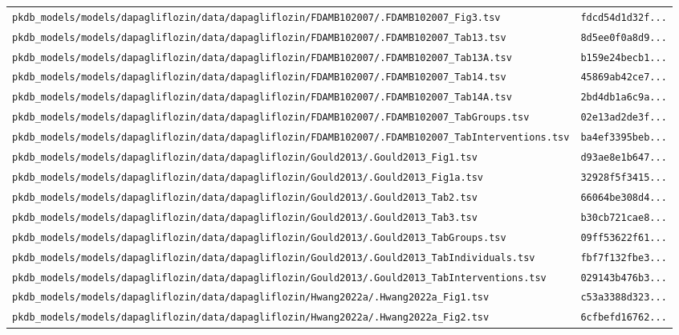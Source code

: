 \begin{longtable}{ll}
\texttt{pkdb\_models/models/dapagliflozin/data/dapagliflozin/FDAMB102007/.FDAMB102007\_Fig3.tsv} & \texttt{fdcd54d1d32f...} \\
\texttt{pkdb\_models/models/dapagliflozin/data/dapagliflozin/FDAMB102007/.FDAMB102007\_Tab13.tsv} & \texttt{8d5ee0f0a8d9...} \\
\texttt{pkdb\_models/models/dapagliflozin/data/dapagliflozin/FDAMB102007/.FDAMB102007\_Tab13A.tsv} & \texttt{b159e24becb1...} \\
\texttt{pkdb\_models/models/dapagliflozin/data/dapagliflozin/FDAMB102007/.FDAMB102007\_Tab14.tsv} & \texttt{45869ab42ce7...} \\
\texttt{pkdb\_models/models/dapagliflozin/data/dapagliflozin/FDAMB102007/.FDAMB102007\_Tab14A.tsv} & \texttt{2bd4db1a6c9a...} \\
\texttt{pkdb\_models/models/dapagliflozin/data/dapagliflozin/FDAMB102007/.FDAMB102007\_TabGroups.tsv} & \texttt{02e13ad2de3f...} \\
\texttt{pkdb\_models/models/dapagliflozin/data/dapagliflozin/FDAMB102007/.FDAMB102007\_TabInterventions.tsv} & \texttt{ba4ef3395beb...} \\
\texttt{pkdb\_models/models/dapagliflozin/data/dapagliflozin/Gould2013/.Gould2013\_Fig1.tsv} & \texttt{d93ae8e1b647...} \\
\texttt{pkdb\_models/models/dapagliflozin/data/dapagliflozin/Gould2013/.Gould2013\_Fig1a.tsv} & \texttt{32928f5f3415...} \\
\texttt{pkdb\_models/models/dapagliflozin/data/dapagliflozin/Gould2013/.Gould2013\_Tab2.tsv} & \texttt{66064be308d4...} \\
\texttt{pkdb\_models/models/dapagliflozin/data/dapagliflozin/Gould2013/.Gould2013\_Tab3.tsv} & \texttt{b30cb721cae8...} \\
\texttt{pkdb\_models/models/dapagliflozin/data/dapagliflozin/Gould2013/.Gould2013\_TabGroups.tsv} & \texttt{09ff53622f61...} \\
\texttt{pkdb\_models/models/dapagliflozin/data/dapagliflozin/Gould2013/.Gould2013\_TabIndividuals.tsv} & \texttt{fbf7f132fbe3...} \\
\texttt{pkdb\_models/models/dapagliflozin/data/dapagliflozin/Gould2013/.Gould2013\_TabInterventions.tsv} & \texttt{029143b476b3...} \\
\texttt{pkdb\_models/models/dapagliflozin/data/dapagliflozin/Hwang2022a/.Hwang2022a\_Fig1.tsv} & \texttt{c53a3388d323...} \\
\texttt{pkdb\_models/models/dapagliflozin/data/dapagliflozin/Hwang2022a/.Hwang2022a\_Fig2.tsv} & \texttt{6cfbefd16762...} \\

\end{longtable}
